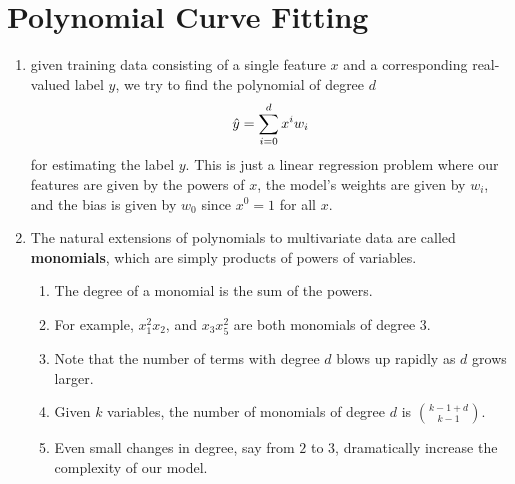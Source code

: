 \section{Polynomial Curve Fitting \cite{dnn-1}}\label{Polynomial Curve Fitting}

\begin{enumerate}[itemsep=0.2cm]
    \item given training data consisting of a single feature $x$ and a corresponding real-valued label $y$, we try to find the polynomial of degree $d$
    \[
        \hfill
        \hat{y}= \dsum_{i=0}^d x^i w_i
        \hfill
    \]
    for estimating the label $y$. This is just a linear regression problem where our features are given by the powers of $x$, the model’s weights are given by $w_i$, and the bias is given by $w_0$ since $x^0 = 1$ for all $x$. 

    \item  The natural extensions of polynomials to multivariate data are called \textbf{monomials}, which are simply products of powers of variables. 
    \begin{enumerate}
        \item The degree of a monomial is the sum of the powers. 

        \item For example, $x_1^2 x_2$, and $x_3 x_5^2$ are both monomials of degree $3$.

        \item Note that the number of terms with degree $d$ blows up rapidly as $d$ grows larger. 
        
        \item Given $k$ variables, the number of monomials of degree $d$ is ${k - 1 + d} \choose {k - 1}$. 
        
        \item Even small changes in degree, say from $2$ to $3$, dramatically increase the complexity of our model.
    \end{enumerate}

\end{enumerate}















